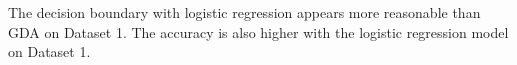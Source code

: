 \begin{answer}
The decision boundary with logistic regression appears more reasonable than GDA on Dataset 1. The accuracy is also higher with the logistic regression model on Dataset 1.
\end{answer}
